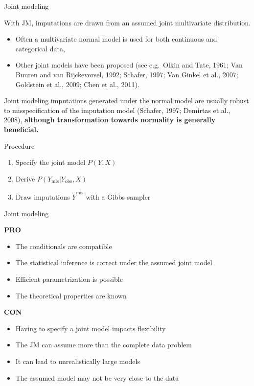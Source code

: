 \documentclass[ignorenonframetext,]{beamer}
\providecommand{\tightlist}{%
  \setlength{\itemsep}{0pt}\setlength{\parskip}{0pt}}
\begin{document}
\begin{frame}{Joint modeling}
\protect\hypertarget{joint-modeling}{}

With JM, imputations are drawn from an assumed joint multivariate
distribution.

\begin{itemize}
\tightlist
\item
  Often a multivariate normal model is used for both continuous and
  categorical data,
\item
  Other joint models have been proposed (see e.g.~Olkin and Tate, 1961;
  Van Buuren and van Rijckevorsel, 1992; Schafer, 1997; Van Ginkel et
  al., 2007; Goldstein et al., 2009; Chen et al., 2011).
\end{itemize}

Joint modeling imputations generated under the normal model are usually
robust to misspecification of the imputation model (Schafer, 1997;
Demirtas et al., 2008), \textbf{although transformation towards
normality is generally beneficial.}

\begin{block}{Procedure}

\begin{enumerate}
\tightlist
\item
  Specify the joint model \(P(Y,X)\)
\item
  Derive \(P(Y_\mathrm{mis}|Y_\mathrm{obs},X)\)
\item
  Draw imputations \(\dot Y^\mathrm{mis}\) with a Gibbs sampler
\end{enumerate}

\end{block}

\end{frame}

\begin{frame}{Joint modeling}
\protect\hypertarget{joint-modeling-1}{}

\textbf{PRO}

\begin{itemize}
\tightlist
\item
  The conditionals are compatible
\item
  The statistical inference is correct under the assumed joint model
\item
  Efficient parametrization is possible
\item
  The theoretical properties are known
\end{itemize}

\textbf{CON}

\begin{itemize}
\tightlist
\item
  Having to specify a joint model impacts flexibility
\item
  The JM can assume more than the complete data problem
\item
  It can lead to unrealistically large models
\item
  The assumed model may not be very close to the data
\end{itemize}

\end{frame}
\end{document}
